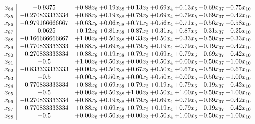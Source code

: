 \documentclass[8pt]{article}
\begin{document}
\[\begin{array}{c| c c@{\hskip 2pt} c@{\hskip 2pt} c@{\hskip 2pt} c@{\hskip 2pt} c@{\hskip 2pt} c@{\hskip 2pt} c@{\hskip 2pt} }
 x_{84}   &  -0.9375 & +  0.88 x_{8} & +  0.19 x_{38} & +  0.13 x_{3} & +  0.69 x_{4} & +  0.13 x_{5} & +  0.69 x_{37} & +  0.75 x_{10}\\
 x_{85}   &  -0.270833333334 & +  0.88 x_{8} & +  0.19 x_{38} & +  0.79 x_{3} & +  0.69 x_{4} & +  0.79 x_{5} & +  0.69 x_{37} & +  0.42 x_{10}\\
 x_{86}   &  -0.979166666667 & +  0.63 x_{8} & +  0.06 x_{38} & +  0.71 x_{3} & +  0.56 x_{4} & +  0.71 x_{5} & +  0.56 x_{37} & +  0.58 x_{10}\\
 x_{87}   &  -0.0625 & +  0.12 x_{8} & +  0.81 x_{38} & +  0.87 x_{3} & +  0.31 x_{4} & +  0.87 x_{5} & +  0.31 x_{37} & +  0.25 x_{10}\\
 x_{88}   &  -0.166666666667 & +  1.00 x_{8} & +  0.50 x_{38} & +  0.33 x_{3} & +  0.50 x_{4} & +  0.33 x_{5} & +  0.50 x_{37} & +  0.33 x_{10}\\
 x_{89}   &  -0.770833333333 & +  0.88 x_{8} & +  0.69 x_{38} & +  0.79 x_{3} & +  0.19 x_{4} & +  0.79 x_{5} & +  0.19 x_{37} & +  0.42 x_{10}\\
 x_{90}   &  -0.270833333334 & +  0.88 x_{8} & +  0.19 x_{38} & +  0.79 x_{3} & +  0.69 x_{4} & +  0.79 x_{5} & +  0.69 x_{37} & +  0.42 x_{10}\\
 x_{91}   &  -0.5 & +  1.00 x_{8} & +  0.50 x_{38} & +  0.00 x_{3} & +  0.50 x_{4} & +  0.00 x_{5} & +  0.50 x_{37} & +  1.00 x_{10}\\
 x_{92}   &  -0.833333333333 & +  0.00 x_{8} & +  0.50 x_{38} & +  0.67 x_{3} & +  0.50 x_{4} & +  0.67 x_{5} & +  0.50 x_{37} & +  0.67 x_{10}\\
 x_{93}   &  -0.5 & +  0.00 x_{8} & +  0.50 x_{38} & +  0.00 x_{3} & +  0.50 x_{4} & +  0.00 x_{5} & +  0.50 x_{37} & +  1.00 x_{10}\\
 x_{94}   &  -0.770833333334 & +  0.88 x_{8} & +  0.69 x_{38} & +  0.79 x_{3} & +  0.19 x_{4} & +  0.79 x_{5} & +  0.19 x_{37} & +  0.42 x_{10}\\
 x_{95}   &  -0.5 & +  0.00 x_{8} & +  0.50 x_{38} & +  1.00 x_{3} & +  0.50 x_{4} & +  1.00 x_{5} & +  0.50 x_{37} & +  1.00 x_{10}\\
 x_{96}   &  -0.270833333334 & +  0.88 x_{8} & +  0.19 x_{38} & +  0.79 x_{3} & +  0.69 x_{4} & +  0.79 x_{5} & +  0.69 x_{37} & +  0.42 x_{10}\\
 x_{97}   &  -0.770833333334 & +  0.88 x_{8} & +  0.69 x_{38} & +  0.79 x_{3} & +  0.19 x_{4} & +  0.79 x_{5} & +  0.19 x_{37} & +  0.42 x_{10}\\
 x_{98}   &  -0.5 & +  0.00 x_{8} & +  0.50 x_{38} & +  0.00 x_{3} & +  0.50 x_{4} & +  1.00 x_{5} & +  0.50 x_{37} & +  1.00 x_{10}\\

\end{array}\]
\end{document}
